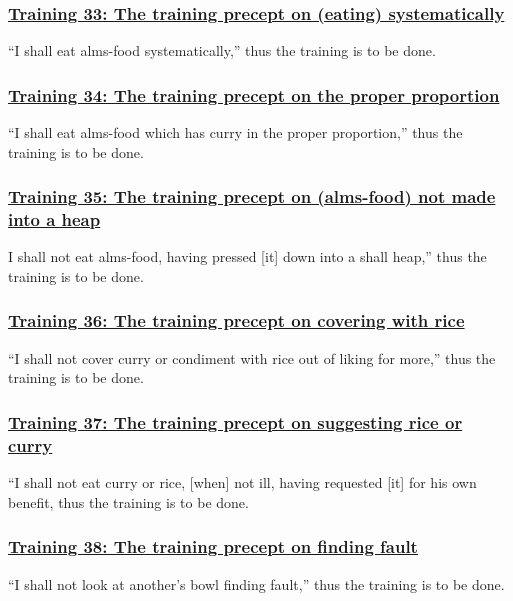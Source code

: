 \subsubsection*{\hyperref[sekh33]{Training 33: The training precept on (eating) systematically}}
\label{training33}
``I shall eat alms-food systematically,'' thus the training is to be done.



\subsubsection*{\hyperref[sekh34]{Training 34: The training precept on the proper proportion}}
\label{training34}
``I shall eat alms-food which has curry in the proper proportion,'' thus the training is to be done.



\subsubsection*{\hyperref[sekh35]{Training 35: The training precept on (alms-food) not made into a heap}}
\label{training35}
I shall not eat alms-food, having pressed [it] down into a shall heap,'' thus the training is to be done.



\subsubsection*{\hyperref[sekh36]{Training 36: The training precept on covering with rice}}
\label{training36}
``I shall not cover curry or condiment with rice out of liking for more,'' thus the training is to be done.



\subsubsection*{\hyperref[sekh37]{Training 37: The training precept on suggesting rice or curry}}
\label{training37}
``I shall not eat curry or rice, [when] not ill, having requested [it] for his own benefit, thus the training is to be done.



\subsubsection*{\hyperref[sekh38]{Training 38: The training precept on finding fault}}
\label{training38}
``I shall not look at another's bowl finding fault,'' thus the training is to be done.



